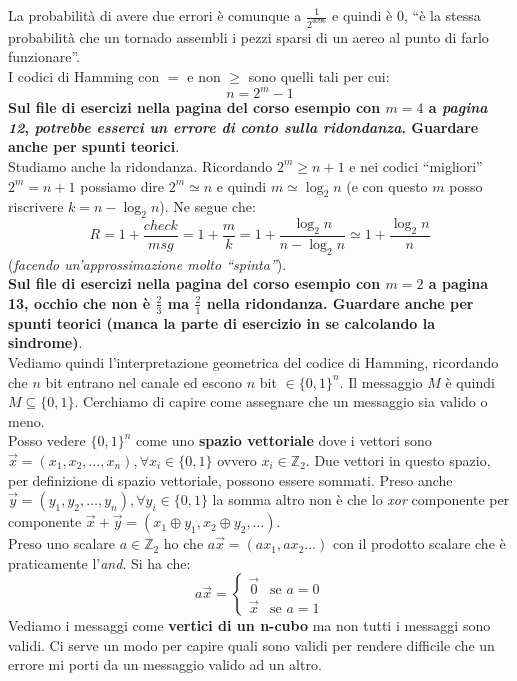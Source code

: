 \documentclass[a4paper,12pt, oneside]{book}
\begin{document}
La probabilità di avere due errori è comunque a $\frac{1}{2^{4096}}$ e quindi è
0, ``è la stessa probabilità che un tornado assembli i pezzi sparsi di un aereo
al punto di farlo funzionare''.\\
I codici di Hamming con $=$ e non $\geq$ sono quelli tali per cui:
\[n=2^m-1\]
\textbf{Sul file di esercizi nella pagina del corso esempio con $m=4$ a
  \textit{pagina 12}, \textit{potrebbe esserci un errore di conto sulla
    ridondanza}. Guardare anche per spunti teorici}.\\ 
Studiamo anche la ridondanza. Ricordando $2^m\geq n+1$ e nei codici ``migliori''
$2^m=n+1$ possiamo dire $2^m\simeq n$ e quindi $m\simeq \log_2 n$ (e con questo
$m$ posso riscrivere $k= n-\log_2n$). Ne segue che:
\[R=1+\frac{check}{msg}=1+\frac{m}{k}=1+\frac{\log_2 n}{n-\log_2n}\simeq
  1+\frac{\log_2n}{n}\]
(\textit{facendo un'approssimazione molto ``spinta''}).\\
\textbf{Sul file di esercizi nella pagina del corso esempio con $m=2$ a pagina
  13, occhio che non è $\frac{2}{3}$ ma $\frac{2}{1}$ nella ridondanza. Guardare
  anche per spunti teorici (manca la parte di esercizio in se calcolando la
  sindrome)}.\\ 
Vediamo quindi l'interpretazione geometrica del codice di Hamming, ricordando
che $n$ bit entrano nel canale ed escono $n$ bit $\in \{0,1\}^n$. Il messaggio
$M$ è quindi $M\subseteq \{0,1\}$. Cerchiamo di capire come assegnare che un
messaggio sia valido o meno.\\
Posso vedere $\{0,1\}^n$ come uno \textbf{spazio vettoriale} dove i vettori sono
$\vec{x}=(x_1,x_2,\ldots,x_n), \forall x_i\in\{0,1\}$ ovvero
$x_i\in\mathbb{Z}_2$. Due vettori in questo spazio, per definizione di spazio
vettoriale, possono essere sommati. Preso 
anche $\vec{y}=(y_1,y_2,\ldots,y_n), \forall y_i\in\{0,1\}$ la somma altro non
è che lo \textit{xor} componente per componente $\vec{x}+\vec{y}=(x_1\oplus y_1,
x_2\oplus y_2,\ldots)$. \\
Preso uno scalare $a\in \mathbb{Z}_2$ ho che $a\vec{x}=(ax_1,ax_2\ldots)$ con il
prodotto scalare che è praticamente l'\textit{and}. Si ha che:
\[a\vec{x}=
  \begin{cases}
    \vec{0} &\mbox{se } a=0\\
    \vec{x} &\mbox{se } a=1
  \end{cases}
\]
Vediamo i messaggi come \textbf{vertici di un n-cubo} ma non tutti i messaggi
sono validi. Ci serve un modo per capire quali sono validi per rendere difficile
che un errore mi porti da un messaggio valido ad un altro.
\end{document}
